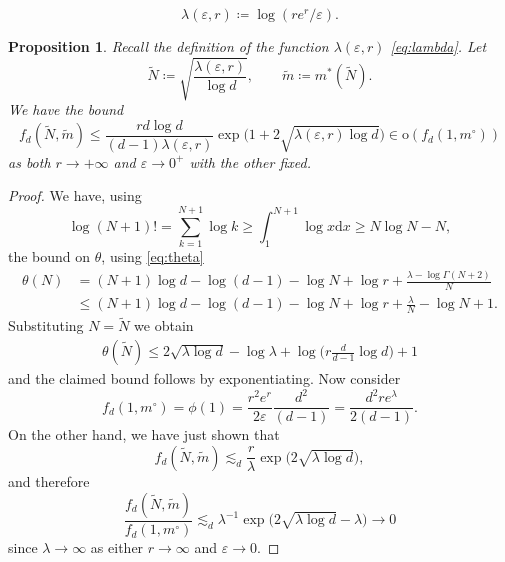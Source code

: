 \documentclass[10pt,a4paper]{amsart}
\newtheorem{proposition}{Proposition}
\def\d{\mathrm{d}}
\def\eps{\varepsilon}
\begin{document}
\begin{equation}\label{eq:lambda}
\lambda(\eps, r) \coloneqq \log(r e^r/\eps).
\end{equation}

\begin{proposition}\label{thm:optimal1var}
Recall the definition of the function $\lambda(\eps, r)$ \eqref{eq:lambda}. Let
\[
\widetilde N \coloneqq \sqrt{\frac{\lambda(\eps,r)}{\log d}}, \qquad \widetilde m \coloneqq m^*(\widetilde N).
\]
We have the bound
\[
f_d(\widetilde N, \widetilde m) \leq \frac{r d \log d}{(d-1)\lambda(\eps,r)} \exp\big(1 + 2 \sqrt{\lambda(\eps,r)\log d}\big) \in \mathrm{o}(f_d(1, m^\circ))
\]
as both $r \to +\infty$ and $\eps \to 0^+$ with the other fixed.
\end{proposition}

\begin{proof}
We have, using
\[
\log (N+1)! = \sum_{k = 1}^{N+1} \log k \geq \int_1^{N+1} \log x \d x \geq N \log N - N,
\]
the bound on $\theta$, using \eqref{eq:theta}
\begin{align*}
	\theta(N) &= (N+1)\log d - \log(d-1) - \log N + \log r + \frac{\lambda - \log \Gamma(N+2)}{N} \\
	&\leq (N+1)\log d - \log(d-1) - \log N + \log r + \frac{\lambda}{N} - \log N + 1.
\end{align*}
Substituting $N = \widetilde N$ we obtain
\begin{align*}
	\theta(\widetilde N) \leq 2 \sqrt{\lambda \log d} - \log \lambda + \log \Big( r \frac{d}{d-1} \log d  \Big) + 1
\end{align*}
and the claimed bound follows by exponentiating. Now consider 
\[
f_d(1, m^\circ) = \phi(1) =  \frac{r^2e^r}{2\eps}\frac{d^2}{(d-1)} = \frac{d^2 r e^\lambda}{2(d-1)}.
\]
On the other hand, we have just shown that
\[
f_d(\widetilde N, \widetilde m) \lesssim_d \frac{r}{\lambda} \exp\big( 2\sqrt{\lambda \log d} \big),
\]
and therefore
\[
\frac{f_d(\widetilde N, \widetilde m)}{f_d(1,m^\circ)} \lesssim_d \lambda^{-1} \exp \big( 2 \sqrt{\lambda \log d} - \lambda \big) \to 0
\]
since $\lambda \to \infty$ as either $r \to \infty$ and $\eps \to 0$.
\end{proof}
\end{document}
